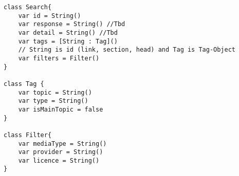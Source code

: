 \begin{lstlisting}
class Search{
    var id = String()
    var response = String() //Tbd
    var detail = String() //Tbd
    var tags = [String : Tag]()
    // String is id (link, section, head) and Tag is Tag-Object
    var filters = Filter()
}

class Tag {
    var topic = String()
    var type = String()
    var isMainTopic = false
}

class Filter{
    var mediaType = String()
    var provider = String()
    var licence = String()
}
\end{lstlisting}